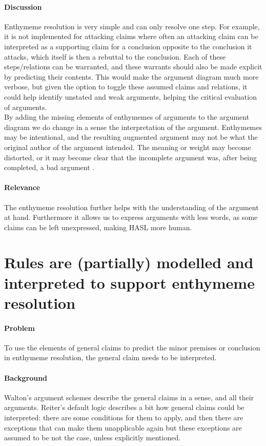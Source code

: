 \documentclass{article}
\let\stdsection\section
\renewcommand\section{\newpage\stdsection}
\begin{document}
\paragraph{Discussion} Enthymeme resolution is very simple and can only resolve one step. For example, it is not implemented for attacking claims where often an attacking claim can be interpreted as a supporting claim for a conclusion opposite to the conclusion it attacks, which itself is then a rebuttal to the conclusion. Each of these steps/relations can be warranted, and these warrants should also be made explicit by predicting their contents. This would make the argument diagram much more verbose, but given the option to toggle these assumed claims and relations, it could help identify unstated and weak arguments, helping the critical evaluation of arguments.\\
By adding the missing elements of enthymemes of arguments to the argument diagram we do change in a sense the interpretation of the argument. Enthymemes may be intentional, and the resulting augmented argument may not be what the original author of the argument intended. The meaning or weight may become distorted, or it may become clear that the incomplete argument was, after being completed, a bad argument \cite{waltonReed2005}.
\paragraph{Relevance} The enthymeme resolution further helps with the understanding of the argument at hand. Furthermore it allows us to express arguments with less words, as some claims can be left unexpressed, making HASL more human.

\section{Rules are (partially) modelled and interpreted to support enthymeme resolution}

\paragraph{Problem} To use the elements of general claims to predict the minor premises or conclusion in enthymeme resolution, the general claim needs to be interpreted.
\paragraph{Background} Walton's argument schemes describe the general claims in a sense, and all their arguments. Reiter's default logic describes a bit how general claims could be interpreted: there are some conditions for them to apply, and then there are exceptions that can make them unapplicable again but these exceptions are assumed to be not the case, unless explicitly mentioned.
\end{document}
